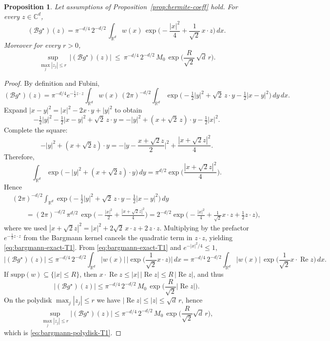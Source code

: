 \documentclass[11pt]{article}
\newtheorem{proposition}{Proposition}[section] %
\theoremstyle{remark}
\numberwithin{equation}{section}
\newcommand{\C}{\mathbb{C}}
\newcommand{\R}{\mathbb{R}}
\renewcommand{\Re}{\operatorname{Re}}
\begin{document}
\begin{proposition}\label{prop:bargmann-bound}
Let assumptions of Proposition~\ref{prop:hermite-coeff} hold. For every $z\in\C^d$,
\begin{equation}\label{eq:bargmann-exact-T1}
(\mathcal B g^\star)(z)
=
\pi^{-d/4}\,2^{-d/2}\,
\int_{\R^d} w(x)\,
\exp\!\Big(
-\frac{|x|^2}{4}
+\frac{1}{\sqrt2}\,x\cdot z
\Big)\,dx .
\end{equation}
Moreover for every $r>0$,
\begin{equation}\label{eq:bargmann-polydisk-T1}
\sup_{\max_j |z_j|\le r}\,|(\mathcal B g^\star)(z)|
\ \le\
\pi^{-d/4}\,2^{-d/2}\,M_0\,
\exp\!\Big(\frac{R}{\sqrt2}\,\sqrt d\,r\Big).
\end{equation}
\end{proposition}
\begin{proof}
By definition and Fubini,
\[
(\mathcal B g^\star)(z)
=\pi^{-d/4}e^{-\frac12 z\cdot z}
\int_{\R^d} w(x)\,(2\pi)^{-d/2}\!
\int_{\R^d}
\exp\!\Big(-\tfrac12|y|^2+\sqrt2\,z\cdot y-\tfrac12|x-y|^2\Big)\,dy\,dx.
\]
Expand $|x-y|^2=|x|^2-2x\cdot y+|y|^2$ to obtain
\[
-\tfrac12|y|^2-\tfrac12|x-y|^2+\sqrt2\,z\cdot y
=
-|y|^2+(x+\sqrt2\,z)\cdot y-\tfrac12|x|^2.
\]
Complete the square:
\[
-|y|^2+(x+\sqrt2 z)\cdot y
=
-\Big|y-\frac{x+\sqrt2 z}{2}\Big|^2
+\frac{|x+\sqrt2 z|^2}{4}.
\]
Therefore,
\[
\int_{\R^d}\exp\!\Big(-|y|^2+(x+\sqrt2 z)\cdot y\Big)\,dy
=\pi^{d/2}\exp\!\Big(\frac{|x+\sqrt2 z|^2}{4}\Big).
\]
Hence
\begin{align*}
&(2\pi)^{-d/2}\int_{\R^d}
\exp\!\Big(-\tfrac12|y|^2+\sqrt2\,z\cdot y-\tfrac12|x-y|^2\Big)\,dy
\\
&\qquad
=(2\pi)^{-d/2}\,\pi^{d/2}\,
\exp\!\Big(-\frac{|x|^2}{2}+\frac{|x+\sqrt2 z|^2}{4}\Big)
=2^{-d/2}\exp\!\Big(-\frac{|x|^2}{4}+\frac{1}{\sqrt2}x\cdot z+\frac12 z\cdot z\Big),
\end{align*}
where we used $|x+\sqrt2 z|^2=|x|^2+2\sqrt2\,x\cdot z+2\,z\cdot z$.
Multiplying by the prefactor $e^{-\frac12 z\cdot z}$ from the Bargmann kernel cancels
the quadratic term in $z\cdot z$, yielding \eqref{eq:bargmann-exact-T1}.
From \eqref{eq:bargmann-exact-T1} and $e^{-|x|^2/4}\le 1$,
\[
|(\mathcal B g^\star)(z)|
\le
\pi^{-d/4}\,2^{-d/2}\int_{\R^d} |w(x)|\,
\Big|\exp\!\Big(\frac{1}{\sqrt2}x\cdot z\Big)\Big|\,dx
=
\pi^{-d/4}\,2^{-d/2}\int_{\R^d} |w(x)|\,
\exp\!\Big(\frac{1}{\sqrt2}x\cdot \Re z\Big)\,dx.
\]
If $\mathrm{supp}(w)\subseteq\{|x|\le R\}$, then $x\cdot \Re z\le |x|\,|\Re z|\le R\,|\Re z|$,
and thus
\[
|(\mathcal B g^\star)(z)|
\le
\pi^{-d/4}\,2^{-d/2}\,M_0\,
\exp\!\Big(\frac{R}{\sqrt2}|\Re z|\Big).
\]
On the polydisk $\max_j|z_j|\le r$ we have $|\Re z|\le |z|\le \sqrt d\,r$, hence
\[
\sup_{\max_j |z_j|\le r}|(\mathcal B g^\star)(z)|
\le
\pi^{-d/4}\,2^{-d/2}\,M_0\,
\exp\!\Big(\frac{R}{\sqrt2}\sqrt d\,r\Big),
\]
which is \eqref{eq:bargmann-polydisk-T1}. 
\end{proof}
\end{document}
